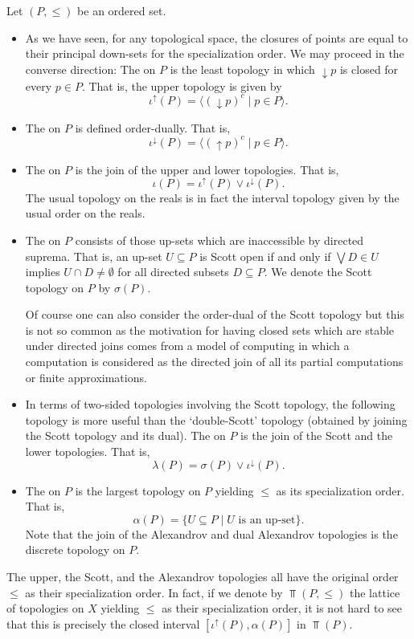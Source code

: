 Let $(P,\leq)$ be an ordered set.
\begin{itemize}
\item As we have seen, for any topological space, the closures of points are equal to their principal down-sets for the specialization order. We may proceed in the converse direction: The  on $P$ is the least topology in which ${\downarrow} p$ is closed for every $p\in P$. That is, the upper topology is given by
\[
\iota^\uparrow(P)=\langle({\downarrow} p)^c\mid p\in P\rangle.
\]
\item The  on $P$ is defined order-dually. That is,
\[
\iota^\downarrow(P)=\langle({\uparrow} p)^c\mid p\in P\rangle.
\]
\item The  on $P$ is the join of the upper and lower topologies. That is,
\[
\iota(P)=\iota^\uparrow(P)\vee\iota^\downarrow(P).
\]
The usual topology on the reals is in fact the interval topology given by the usual order on the reals.
\item The   on $P$ consists of those up-sets which are inaccessible by directed suprema. That is, an up-set $U\subseteq P$ is Scott open if and only if $\bigvee D\in U$ implies $U\cap D\neq\emptyset$ for all directed subsets $D\subseteq P$. We denote the Scott topology on $P$ by $\sigma(P)$.

Of course one can also consider the order-dual of the Scott topology but this is not so common as the motivation for having closed sets which are stable under directed joins comes from a model of computing in which a computation is considered as the directed join of all its partial computations or finite approximations.

\item In terms of two-sided topologies involving the Scott topology, the following topology is more useful than the `double-Scott' topology (obtained by joining the Scott topology and its dual). The  on $P$ is the join of the Scott and the lower topologies. That is,
\[
\lambda(P)=\sigma(P)\vee\iota^{\downarrow}(P).
\]

\item The  on $P$ is the largest topology on $P$ yielding $\leq$ as its specialization order. That is,
\[
\alpha(P)=\{ U\subseteq P\mid U\text{ is an up-set}\}.
\]
Note that the join of the Alexandrov and dual Alexandrov topologies is the discrete topology on $P$.
\end{itemize}
The upper, the Scott, and the Alexandrov topologies all have the original order $\leq$ as their specialization order. In fact, if we denote by $\Top(P,\leq)$ the lattice of topologies on $X$ yielding $\leq$ as their specialization order, it is not hard to see that this is precisely the closed interval $[\iota^\uparrow(P),\alpha(P)]$ in $\Top(P)$.

